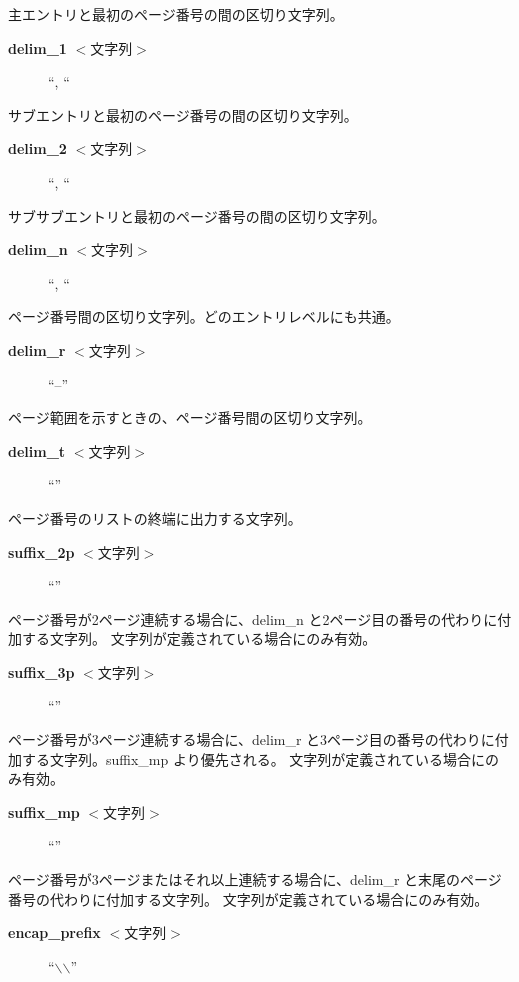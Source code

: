 \documentclass[10pt,dvipdfmx]{jsarticle}
\begin{document}
 主エントリと最初のページ番号の間の区切り文字列。\begin{description}
\item[\textbf{delim\_1}
 $<$文字列$>$] ``, ``

\end{description}
 サブエントリと最初のページ番号の間の区切り文字列。\begin{description}
\item[\textbf{delim\_2}
 $<$文字列$>$] ``, ``

\end{description}
 サブサブエントリと最初のページ番号の間の区切り文字列。\begin{description}
\item[\textbf{delim\_n}
 $<$文字列$>$] ``, ``

\end{description}
 ページ番号間の区切り文字列。どのエントリレベルにも共通。\begin{description}
\item[\textbf{delim\_r}
 $<$文字列$>$] ``--''

\end{description}
 ページ範囲を示すときの、ページ番号間の区切り文字列。\begin{description}
\item[\textbf{delim\_t}
 $<$文字列$>$] ``''

\end{description}
 ページ番号のリストの終端に出力する文字列。\begin{description}
\item[\textbf{suffix\_2p}
 $<$文字列$>$] ``''

\end{description}
 ページ番号が2ページ連続する場合に、delim\_n と2ページ目の番号の代わりに付加する文字列。 文字列が定義されている場合にのみ有効。\begin{description}
\item[\textbf{suffix\_3p}
 $<$文字列$>$] ``''

\end{description}
 ページ番号が3ページ連続する場合に、delim\_r と3ページ目の番号の代わりに付加する文字列。suffix\_mp より優先される。 文字列が定義されている場合にのみ有効。\begin{description}
\item[\textbf{suffix\_mp}
 $<$文字列$>$] ``''

\end{description}
 ページ番号が3ページまたはそれ以上連続する場合に、delim\_r と末尾のページ番号の代わりに付加する文字列。 文字列が定義されている場合にのみ有効。\begin{description}
\item[\textbf{encap\_prefix}
 $<$文字列$>$] ``$\backslash$$\backslash$''

\end{description}
\end{document}

